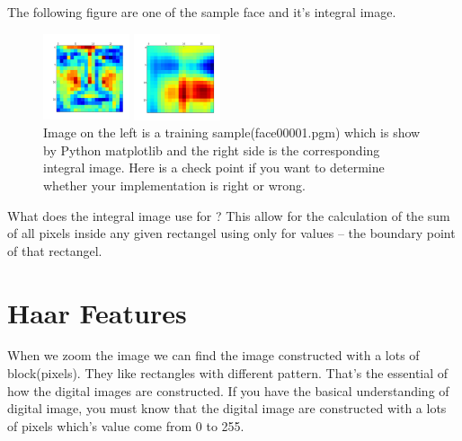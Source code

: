 \documentclass[a4paper, 11pt]{article} %
\begin{document}
    The following figure are one of the sample face and it's integral image.
    \begin{figure}[H]
        \centering
        \begin{minipage}[t]{0.25\linewidth}
        \centering
        \includegraphics[height = 1.0in, width= 1.0in]{../figure/face00001.png}
        \end{minipage}
        \begin{minipage}[t]{0.25\linewidth}
        \centering
        \includegraphics[height = 1.0in, width= 1.0in]{../figure/integralImageOfFace00001.png}
        \end{minipage}
        \label{fig:integralImageFace}
        \caption{Image on the left is a training sample(face00001.pgm) which is show by Python matplotlib and the right side is the corresponding integral image. Here is a check point if you want to determine whether your implementation is right or wrong.}

    \end{figure}

    What does the integral image use for ?
    This allow for the calculation of the sum of all pixels inside any given rectangel using only for values -- the boundary point of that rectangel.

    

\clearpage
\section{Haar Features}
    When we zoom the image we can find the image constructed with a lots of block(pixels). They like rectangles with different pattern. That's the essential of how the digital images are constructed. If you have the basical understanding of digital image, you must know that the digital image are constructed with a lots of pixels which's value come from 0 to 255.\\
\end{document}
